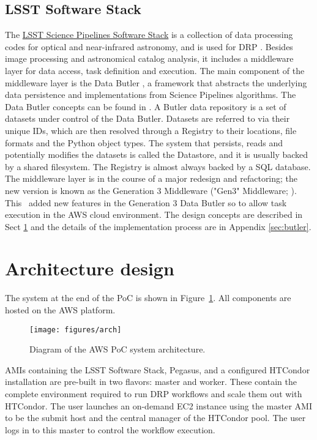 \subsection{LSST Software Stack}
The \href{https://pipelines.lsst.io/}{LSST Science Pipelines Software Stack} is a collection of data processing codes for optical and near-infrared astronomy, and is used for DRP \citep{2019ASPC..523..521B}.
Besides image processing and astronomical catalog analysis, it includes a middleware layer for data access, task definition and execution.
The main component of the middleware layer is the Data Butler \citep{2018arXiv181208085J}, a framework that abstracts the underlying data persistence and implementations from Science Pipelines algorithms.
The Data Butler concepts can be found in .
A Butler data repository is a set of datasets under control of the Data Butler.
Datasets are referred to via their unique IDs, which are then resolved through a Registry to their locations, file formats and the Python object types.
The system that persists, reads and potentially modifies the datasets is called the Datastore, and it is usually backed by a shared filesystem.
The Registry is almost always backed by a SQL database.
The middleware layer is in the course of a major redesign and refactoring; the new version is known as the Generation 3 Middleware ("Gen3" Middleware; ).
This \poc~added new features in the Generation 3 Data Butler so to allow task execution in the AWS cloud environment.
The design concepts are described in Sect \ref{sec:arch} and the details of the implementation process are in Appendix \ref{sec:butler}.


\section{Architecture design} \label{sec:arch}


The system at the end of the PoC is shown in Figure~\ref{fig:arch}.
All components are hosted on the AWS platform.

\begin{figure}
  \centering
  \texttt{[image: figures/arch]}
  \label{fig:arch}
  \caption{Diagram of the AWS PoC system architecture.}
\end{figure}

AMIs containing the LSST Software Stack, Pegasus, and a configured HTCondor installation are pre-built in two flavors: master and worker.
These contain the complete environment required to run DRP workflows and scale them out with HTCondor.
The user launches an on-demand EC2 instance using the master AMI to be the submit host and the central manager of the HTCondor pool.
The user logs in to this master to control the workflow execution.

